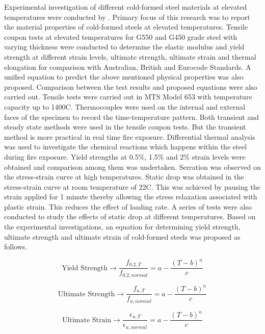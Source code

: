 Experimental investigation of different cold-formed steel materials at elevated temperatures were conducted by \citet{Chen2007}. Primary focus of this research was to report the material properties of cold-formed steels at elevated temperatures. Tensile coupon tests at elevated temperatures for G550 and G450 grade steel with varying thickness were conducted to determine the elastic modulus and yield strength at different strain levels, ultimate strength, ultimate strain and thermal elongation for comparison with Australian, British and Eurocode Standards. A unified equation to predict the above mentioned physical properties was also proposed. Comparison between the test results and proposed equations were also carried out. Tensile tests were carried out in MTS Model 653 with temperature capacity up to 1400\degree C. Thermocouples were used on the internal and external faces of the specimen to record the time-temperature pattern. Both transient and steady state methods were used in the tensile coupon tests. But the transient method is more practical in real time fire exposure. Differential thermal analysis was used to investigate the chemical reactions which happens within the steel during fire exposure. Yield strengths at 0.5\%, 1.5\% and 2\% strain levels were obtained and comparison among them was undertaken. Serration was observed on the stress-strain curve at high temperatures. Static drop was obtained in the stress-strain curve at room temperature of 22\degree C. This was achieved by pausing the strain applied for 1 minute thereby allowing the stress relaxation associated with plastic strain. This reduces the effect of loading rate. A series of tests were also conducted to study the effects of static drop at different temperatures. Based on the experimental investigations, an equation for determining yield strength, ultimate strength and ultimate strain of cold-formed steels was proposed as follows.

\begin{equation}
\text{Yield Strength} \to \dfrac{f_{0.2,T}}{f_{0.2,normal}} = a-\dfrac{(T-b)^{n}}{c}
\end{equation}

\begin{equation}
\text{Ultimate Strength} \to \dfrac{f_{u,T}}{f_{u,normal}} = a-\dfrac{(T-b)^{n}}{c}
\end{equation}

\begin{equation}
\text{Ultimate Strain} \to \dfrac{\epsilon_{u,T}}{\epsilon_{u,normal}} = a-\dfrac{(T-b)^{n}}{c}
\end{equation}


